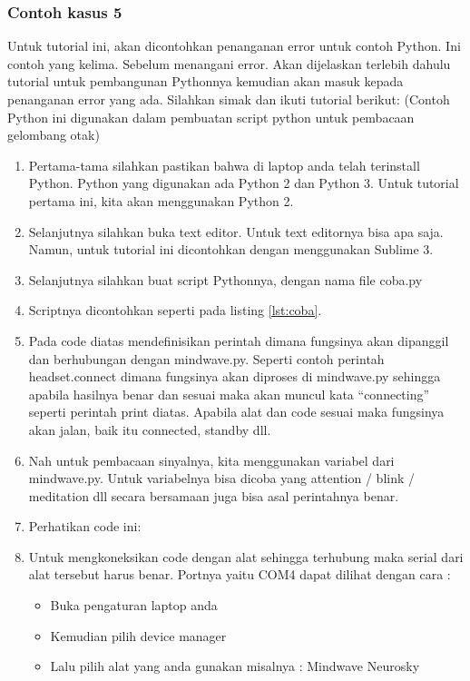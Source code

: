\subsubsection{Contoh kasus 5}
Untuk tutorial ini, akan dicontohkan penanganan error untuk contoh Python. Ini contoh yang kelima. Sebelum menangani error. Akan dijelaskan terlebih dahulu tutorial untuk pembangunan Pythonnya kemudian akan masuk kepada penanganan error yang ada. Silahkan simak dan ikuti tutorial berikut: 
(Contoh Python ini digunakan dalam pembuatan script python untuk pembacaan gelombang otak)
\begin{enumerate}
\item Pertama-tama silahkan pastikan bahwa di laptop anda telah terinstall Python. Python yang digunakan ada Python 2 dan Python 3. Untuk tutorial pertama ini, kita akan menggunakan Python 2.
\item Selanjutnya silahkan buka text editor. Untuk text editornya bisa apa saja. Namun, untuk tutorial ini dicontohkan dengan menggunakan Sublime 3.
\item Selanjutnya silahkan buat script Pythonnya, dengan nama file coba.py
\item Scriptnya dicontohkan seperti pada listing \ref{lst:coba}.

\item Pada code diatas mendefinisikan perintah dimana fungsinya akan dipanggil dan berhubungan dengan mindwave.py. Seperti contoh perintah headset.connect dimana fungsinya akan diproses di mindwave.py sehingga apabila hasilnya benar dan sesuai maka akan muncul kata “connecting” seperti perintah print diatas. Apabila alat dan code sesuai maka fungsinya akan jalan, baik itu connected, standby dll. 
\item Nah untuk pembacaan sinyalnya, kita menggunakan variabel dari mindwave.py. Untuk variabelnya bisa dicoba yang attention / blink / meditation dll secara bersamaan juga bisa asal perintahnya benar.
\item Perhatikan code ini:

\item Untuk mengkoneksikan code dengan alat sehingga terhubung maka serial dari alat tersebut harus benar. Portnya yaitu COM4 dapat dilihat dengan cara :
\begin{itemize}
\item Buka pengaturan laptop anda
\item Kemudian pilih device manager
\item Lalu pilih alat yang anda gunakan misalnya : Mindwave Neurosky

\end{itemize}
\end{enumerate}
